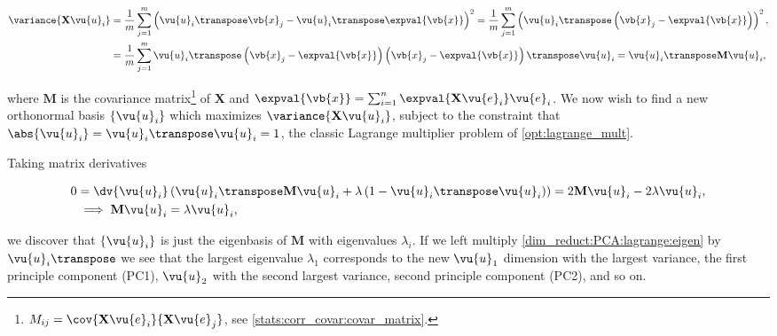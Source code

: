 \begin{subequations}\label{dim_reduct:PCA:variance}
\begin{align}
\variance{\mathbf{X} \vu{u}_{i}}
&= \frac{1}{m}\sum_{j=1}^{m} \left(
\vu{u}_{i}\transpose \vb{x}_{j}
-
\vu{u}_{i}\transpose \expval{\vb{x}}
\right)^{2}
= \frac{1}{m}\sum_{j=1}^{m} \left( \vu{u}_{i}\transpose \left(\vb{x}_{j} - \expval{\vb{x}}\right)\right)^{2}, \label{dim_reduct:PCA:variance:a} \\
&= \frac{1}{m}\sum_{j=1}^{m}
\vu{u}_{i}\transpose
\left(\vb{x}_{j} - \expval{\vb{x}}\right)
\left(\vb{x}_{j} - \expval{\vb{x}}\right)\transpose
\vu{u}_{i}
= \vu{u}_{i}\transpose \mathbf{M} \vu{u}_{i}, \label{dim_reduct:PCA:variance:M}
\end{align}
\end{subequations}

\noindent where $\mathbf{M}$ is
the covariance matrix\footnote{$M_{ij} = \cov{\mathbf{X} \vu{e}_{i}}{\mathbf{X} \vu{e}_{j}}$,
see \cref{stats:corr_covar:covar_matrix}.} of $\mathbf{X}$
and $\expval{\vb{x}} = \sum_{i=1}^{n} \expval{\mathbf{X} \vu{e}_{i}} \vu{e}_{i}$.
We now wish to find a new orthonormal basis $\left\{\vu{u}_{i}\right\}$
which maximizes $\variance{\mathbf{X} \vu{u}_{i}}$,
subject to the constraint that $\abs{\vu{u}_{i}} = \vu{u}_{i}\transpose \vu{u}_{i} = 1$,
\ie the classic Lagrange multiplier problem of \cref{opt:lagrange_mult}.

Taking matrix derivatives

\begin{subequations}\label{dim_reduct:PCA:lagrange}
\begin{align}
0 &= \dv{\vu{u}_{i}} \left( \vu{u}_{i}\transpose \mathbf{M} \vu{u}_{i}
+ \lambda \left( 1 - \vu{u}_{i}\transpose \vu{u}_{i} \right) \right)
= 2 \mathbf{M} \vu{u}_{i} - 2 \lambda \vu{u}_{i}, \label{dim_reduct:PCA:lagrange:setup} \\
&\implies \mathbf{M}\vu{u}_{i} = \lambda \vu{u}_{i}, \label{dim_reduct:PCA:lagrange:eigen}
\end{align}
\end{subequations}

\noindent we discover that $\left\{\vu{u}_{i}\right\}$
is just the eigenbasis of $\mathbf{M}$ with eigenvalues $\lambda_{i}$.
If we left multiply \cref{dim_reduct:PCA:lagrange:eigen} by $\vu{u}_{i}\transpose$
we see that the largest eigenvalue $\lambda_{1}$ corresponds to the
new $\vu{u}_{1}$ dimension with the largest variance, \ie the first principle component (PC1),
$\vu{u}_{2}$ with the second largest variance, \ie second principle component (PC2), and so on.


